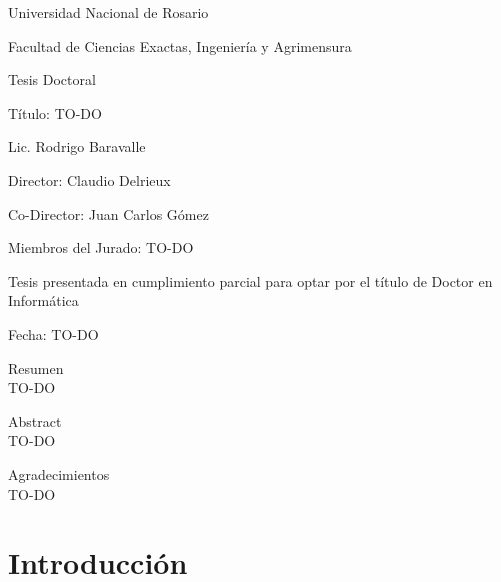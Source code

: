 \documentclass[spanish,a4paper,11pt,oneside,links]{report}
\begin{document}
\begin{center}

Universidad Nacional de Rosario

Facultad de Ciencias Exactas, Ingeniería y Agrimensura

Tesis Doctoral

\vspace{2cm}


{\huge Título: TO-DO}
\vspace{2cm}

{\large Lic. Rodrigo Baravalle}
\vspace{2cm}

{\large Director: Claudio Delrieux}

{\large Co-Director: Juan Carlos Gómez}

\vspace{2cm}
{\large Miembros del Jurado: TO-DO}

\vspace{2cm}
{\large Tesis presentada en cumplimiento parcial para optar por el título de Doctor en Informática}

\vspace{1cm}
Fecha: TO-DO

\end{center}

\newpage
\mbox{}
\thispagestyle{empty} %



\newpage
\begin{center}
{\huge Resumen}\\ TO-DO
\end{center}

\newpage
\begin{center}
{\huge Abstract}\\ TO-DO
\end{center}


\newpage
\begin{center}
{\huge Agradecimientos}\\ TO-DO
\end{center}

\newpage
\mbox{}
\thispagestyle{empty}

\tableofcontents

\newpage

\chapter{Introducción}
\end{document}
